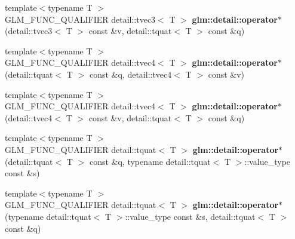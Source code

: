 \begin{DoxyCompactItemize}
\item 
\hypertarget{namespaceglm_1_1detail_ac8613d44bc2e39003a9f9b698ee66132}{}{\footnotesize template$<$typename T $>$ }\\G\+L\+M\+\_\+\+F\+U\+N\+C\+\_\+\+Q\+U\+A\+L\+I\+F\+I\+E\+R detail\+::tvec3$<$ T $>$ {\bfseries glm\+::detail\+::operator$\ast$} (detail\+::tvec3$<$ T $>$ const \&v, detail\+::tquat$<$ T $>$ const \&q)\label{namespaceglm_1_1detail_ac8613d44bc2e39003a9f9b698ee66132}

\item 
\hypertarget{namespaceglm_1_1detail_a545f7ff9c0237b044aa7afbaeea454a6}{}{\footnotesize template$<$typename T $>$ }\\G\+L\+M\+\_\+\+F\+U\+N\+C\+\_\+\+Q\+U\+A\+L\+I\+F\+I\+E\+R detail\+::tvec4$<$ T $>$ {\bfseries glm\+::detail\+::operator$\ast$} (detail\+::tquat$<$ T $>$ const \&q, detail\+::tvec4$<$ T $>$ const \&v)\label{namespaceglm_1_1detail_a545f7ff9c0237b044aa7afbaeea454a6}

\item 
\hypertarget{namespaceglm_1_1detail_a05fb6dd823cc933828159a865d0e82c7}{}{\footnotesize template$<$typename T $>$ }\\G\+L\+M\+\_\+\+F\+U\+N\+C\+\_\+\+Q\+U\+A\+L\+I\+F\+I\+E\+R detail\+::tvec4$<$ T $>$ {\bfseries glm\+::detail\+::operator$\ast$} (detail\+::tvec4$<$ T $>$ const \&v, detail\+::tquat$<$ T $>$ const \&q)\label{namespaceglm_1_1detail_a05fb6dd823cc933828159a865d0e82c7}

\item 
\hypertarget{namespaceglm_1_1detail_a8cc37205ec17ddd9c7ab8d7ad1485911}{}{\footnotesize template$<$typename T $>$ }\\G\+L\+M\+\_\+\+F\+U\+N\+C\+\_\+\+Q\+U\+A\+L\+I\+F\+I\+E\+R detail\+::tquat$<$ T $>$ {\bfseries glm\+::detail\+::operator$\ast$} (detail\+::tquat$<$ T $>$ const \&q, typename detail\+::tquat$<$ T $>$\+::value\+\_\+type const \&s)\label{namespaceglm_1_1detail_a8cc37205ec17ddd9c7ab8d7ad1485911}

\item 
\hypertarget{namespaceglm_1_1detail_aa87e70463fba0101b49aea5d50ff9c0e}{}{\footnotesize template$<$typename T $>$ }\\G\+L\+M\+\_\+\+F\+U\+N\+C\+\_\+\+Q\+U\+A\+L\+I\+F\+I\+E\+R detail\+::tquat$<$ T $>$ {\bfseries glm\+::detail\+::operator$\ast$} (typename detail\+::tquat$<$ T $>$\+::value\+\_\+type const \&s, detail\+::tquat$<$ T $>$ const \&q)\label{namespaceglm_1_1detail_aa87e70463fba0101b49aea5d50ff9c0e}


\end{DoxyCompactItemize}
